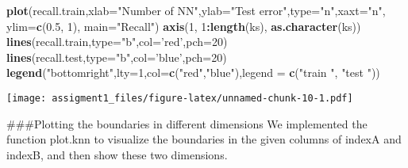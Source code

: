 \documentclass[
]{article}
\newenvironment{Shaded}{\begin{snugshade}}{\end{snugshade}}
\newcommand{\DataTypeTok}[1]{\textcolor[rgb]{0.13,0.29,0.53}{#1}}
\newcommand{\DecValTok}[1]{\textcolor[rgb]{0.00,0.00,0.81}{#1}}
\newcommand{\FloatTok}[1]{\textcolor[rgb]{0.00,0.00,0.81}{#1}}
\newcommand{\KeywordTok}[1]{\textcolor[rgb]{0.13,0.29,0.53}{\textbf{#1}}}
\newcommand{\NormalTok}[1]{#1}
\newcommand{\OperatorTok}[1]{\textcolor[rgb]{0.81,0.36,0.00}{\textbf{#1}}}
\newcommand{\StringTok}[1]{\textcolor[rgb]{0.31,0.60,0.02}{#1}}
\begin{document}
\begin{Shaded}
\begin{Highlighting}[]
\KeywordTok{plot}\NormalTok{(recall.train,}\DataTypeTok{xlab=}\StringTok{"Number of NN"}\NormalTok{,}\DataTypeTok{ylab=}\StringTok{"Test error"}\NormalTok{,}\DataTypeTok{type=}\StringTok{"n"}\NormalTok{,}\DataTypeTok{xaxt=}\StringTok{"n"}\NormalTok{, }\DataTypeTok{ylim=}\KeywordTok{c}\NormalTok{(}\FloatTok{0.5}\NormalTok{, }\DecValTok{1}\NormalTok{),  }\DataTypeTok{main=}\StringTok{"Recall"}\NormalTok{)}
\KeywordTok{axis}\NormalTok{(}\DecValTok{1}\NormalTok{, }\DecValTok{1}\OperatorTok{:}\KeywordTok{length}\NormalTok{(ks), }\KeywordTok{as.character}\NormalTok{(ks))}
\KeywordTok{lines}\NormalTok{(recall.train,}\DataTypeTok{type=}\StringTok{"b"}\NormalTok{,}\DataTypeTok{col=}\StringTok{'red'}\NormalTok{,}\DataTypeTok{pch=}\DecValTok{20}\NormalTok{)}
\KeywordTok{lines}\NormalTok{(recall.test,}\DataTypeTok{type=}\StringTok{"b"}\NormalTok{,}\DataTypeTok{col=}\StringTok{'blue'}\NormalTok{,}\DataTypeTok{pch=}\DecValTok{20}\NormalTok{)}
\KeywordTok{legend}\NormalTok{(}\StringTok{"bottomright"}\NormalTok{,}\DataTypeTok{lty=}\DecValTok{1}\NormalTok{,}\DataTypeTok{col=}\KeywordTok{c}\NormalTok{(}\StringTok{"red"}\NormalTok{,}\StringTok{"blue"}\NormalTok{),}\DataTypeTok{legend =} \KeywordTok{c}\NormalTok{(}\StringTok{"train "}\NormalTok{, }\StringTok{"test "}\NormalTok{))}
\end{Highlighting}
\end{Shaded}

\texttt{[image: assigment1\_files/figure-latex/unnamed-chunk-10-1.pdf]}

\#\#\#Plotting the boundaries in different dimensions We implemented the
function plot.knn to visualize the boundaries in the given columns of
indexA and indexB, and then show these two dimensions.
\end{document}
